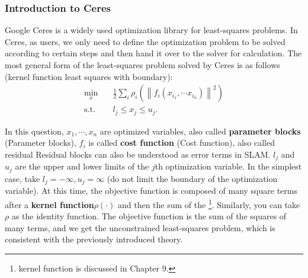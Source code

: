 \subsubsection{Introduction to Ceres}
Google Ceres is a widely used optimization library for least-squares problems. In Ceres, as users, we only need to define the optimization problem to be solved according to certain steps and then hand it over to the solver for calculation. The most general form of the least-squares problem solved by Ceres is as follows (kernel function least squares with boundary):
\begin{equation}
    \begin{array}{ll}
        \min \limits_x \quad & \frac{1}{2}\sum\limits_i {{\rho _i}\left( {{{\left\| {{f_i}\left( {{x_{{i_1}}}, \cdots {x_{{i_n}}}} \right)} \right\|}^2}} \right)} \\
        \mathrm{s.t.} \quad & {l_j} \leqslant {x_j} \leqslant {u_j}.
    \end{array}
\end{equation}

In this question, $x_1, \cdots, x_n$ are optimized variables, also called \textbf{parameter blocks} (Parameter blocks), $f_i$ is called \textbf{cost function} (Cost function), also called residual Residual blocks can also be understood as error terms in SLAM. $l_j$ and $u_j$ are the upper and lower limits of the $j$th optimization variable. In the simplest case, take $l_j = -\infty, u_j=\infty$ (do not limit the boundary of the optimization variable). At this time, the objective function is composed of many square terms after a \textbf{kernel function}$\rho(\cdot)$ and then the sum of the \footnote{kernel function is discussed in Chapter 9. }. Similarly, you can take $\rho$ as the identity function. The objective function is the sum of the squares of many terms, and we get the unconstrained least-squares problem, which is consistent with the previously introduced theory.

